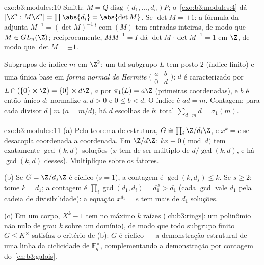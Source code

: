 \begin{solution}{exo:b3:modules:10}
Smith: $M = Q\operatorname{diag}(d_1,\dots,d_n)P$; o~\cref{exo:b3:modules:4} dá $[\Z^n : M\Z^n] = \prod\abs{d_i} =
\abs{\det M}$. Se $\det M = \pm 1$: a fórmula da adjunta
$M^{-1} = (\det M)^{-1}\,{}^{t}\!\operatorname{com}(M)$ tem entradas inteiras, de modo que $M \in GL_n(\Z)$; reciprocamente, $MM^{-1} = I$ dá
$\det M \cdot \det M^{-1} = 1$ em $\Z$, de modo que $\det M = \pm1$.

Subgrupos de índice $m$ em $\Z^2$: um tal subgrupo $L$ tem
posto $2$ (índice finito) e uma única base em \emph{forma normal de
Hermite} $\bigl(\begin{smallmatrix} a & b\\ 0 &
d\end{smallmatrix}\bigr)$: $d$ é caracterizado por $L \cap (\{0\}
\times \Z) = \{0\} \times d\Z$, $a$ por $\pi_1(L) = a\Z$
(primeiras coordenadas), e $b$ é então único  $d$;
normalize $a, d
> 0$ e $0 \leq b < d$. O índice é $ad = m$. Contagem: para cada
divisor $d \mid m$ ($a = m/d$), há $d$ escolhas de $b$: total $\sum_{d \mid m} d = \sigma_1(m)$.
\end{solution}

\begin{solution}{exo:b3:modules:11}
(a) Pelo teorema de estrutura, $G \cong \prod_i\Z/d_i\Z$, e $x^k = e$ se desacopla coordenada a
coordenada. Em $\Z/d\Z$: $kx \equiv 0
\pmod d$ tem exatamente $\gcd(k, d)$ soluções
($x$ tem de ser múltiplo de $d/\gcd(k,d)$, e há $\gcd(k, d)$ desses). Multiplique
sobre os fatores.

(b) Se $G = \Z/d_s\Z$ é cíclico ($s = 1$), a contagem é $\gcd(k, d_s) \leq k$. Se $s \geq 2$: tome
$k = d_1$; a contagem é $\prod_i\gcd(d_1, d_i) = d_1^{\,s} > d_1$ (cada $\gcd$ vale $d_1$ pela cadeia de
divisibilidade): a equação $x^{d_1} = e$ tem mais de $d_1$ soluções.

(c) Em um corpo, $X^k - 1$ tem no máximo $k$ raízes (\cref{ch:b3:rings}: um
polinômio não nulo de grau $k$ sobre um domínio), de modo que todo
subgrupo finito $G \leq K^\times$ satisfaz o critério de (b): $G$ é cíclico --- a
demonstração estrutural de uma linha da ciclicidade de $\mathbb F_q^\times$,
complementando a demonstração por contagem do~\cref{ch:b3:galois}.
\end{solution}

